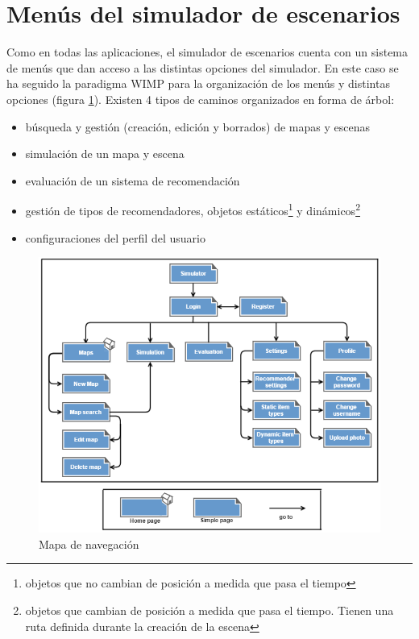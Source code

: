 \section{Menús del simulador de escenarios}

Como en todas las aplicaciones, el simulador de escenarios cuenta con un sistema de menús que dan acceso a las distintas opciones del simulador. En este caso se ha seguido la paradigma WIMP para la organización de los menús y distintas opciones (figura \ref{mapaNavegacion}). Existen 4 tipos de caminos organizados en forma de árbol:

\begin{itemize}
	\item búsqueda y gestión (creación, edición y borrados) de mapas y escenas
	\item simulación de un mapa y escena
	\item evaluación de un sistema de recomendación
	\item gestión de tipos de recomendadores, objetos estáticos\footnote{objetos que no cambian de posición a medida que pasa el tiempo} y dinámicos\footnote{objetos que cambian de posición a medida que pasa el tiempo. Tienen una ruta definida durante la creación de la escena}
	\item configuraciones del perfil del usuario
\end{itemize} 

\begin{figure}[H]
\centering\includegraphics[scale=0.7]{imagenes/mapa-navegacion.png}
\caption{Mapa de navegación}
\label{mapaNavegacion}
\end{figure}

